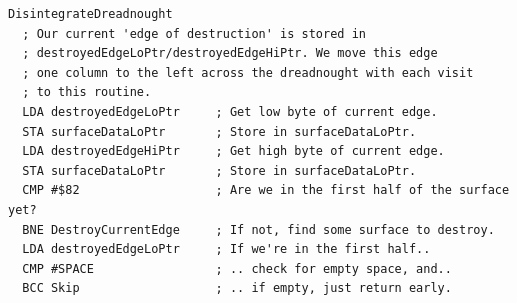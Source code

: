 \begin{lstlisting}
DisintegrateDreadnought
  ; Our current 'edge of destruction' is stored in 
  ; destroyedEdgeLoPtr/destroyedEdgeHiPtr. We move this edge
  ; one column to the left across the dreadnought with each visit
  ; to this routine.
  LDA destroyedEdgeLoPtr     ; Get low byte of current edge.
  STA surfaceDataLoPtr       ; Store in surfaceDataLoPtr.
  LDA destroyedEdgeHiPtr     ; Get high byte of current edge.
  STA surfaceDataLoPtr       ; Store in surfaceDataLoPtr.
  CMP #$82                   ; Are we in the first half of the surface yet?
  BNE DestroyCurrentEdge     ; If not, find some surface to destroy.
  LDA destroyedEdgeLoPtr     ; If we're in the first half..
  CMP #SPACE                 ; .. check for empty space, and..
  BCC Skip                   ; .. if empty, just return early.
\end{lstlisting}

